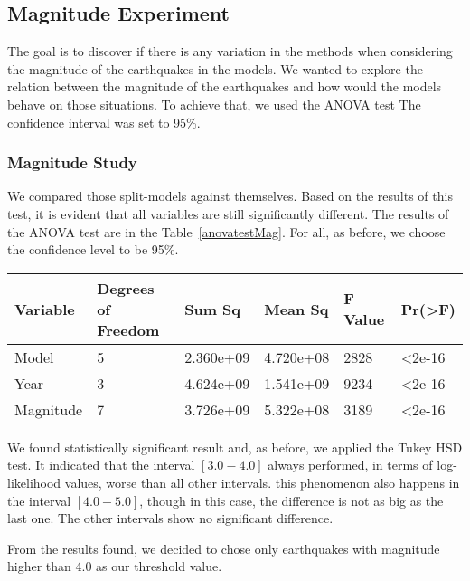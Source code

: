\subsection{Magnitude Experiment}\label{magExp}
The goal is to discover if there is any variation in the methods when considering the magnitude of the earthquakes in the models. We wanted to explore the relation between the magnitude of the earthquakes and how would the models behave on those situations. To achieve that, we used the ANOVA test The confidence interval was set to 95\%.

\subsubsection{Magnitude Study}

We compared those split-models against themselves. Based on the results of this test, it is evident that all variables are still significantly different. The results of the ANOVA test are in the Table~\ref{anovatestMag}. For all, as before, we choose the confidence level to be 95\%.

\begin{table*}[!ht]
	\centering
	\begin{tabular}{|l|l|l|l|l|l|}
		\hline
		{Variable} & {Degrees of Freedom} & {Sum Sq}    & {Mean Sq}   & {F Value} & {Pr(\textgreater F)} \\
		\hline
		Model       & 5            	  & 2.360e+09      & 4.720e+08     & 2828     & \textless2e-16     \\
		\hline
		Year        & 3                  & 4.624e+09   & 1.541e+09    & 9234     & \textless2e-16     \\
		\hline
		Magnitude   & 7                  & 3.726e+09   & 5.322e+08    & 3189     & \textless2e-16	\\    
		\hline
	\end{tabular}
	\caption{ANOVA Test Results Values - Magnitude Study.}
	\label{anovatestMag}
\end{table*}

We found statistically significant result and, as before, we applied the Tukey HSD test. It indicated that the interval $[3.0-4.0]$ always performed, in terms of log-likelihood values, worse than all other intervals. this phenomenon also happens in the interval $[4.0-5.0]$, though in this case, the difference is not as big as the last one. The other intervals show no significant difference.

From the results found, we decided to chose only earthquakes with magnitude higher than 4.0 as our threshold value.




